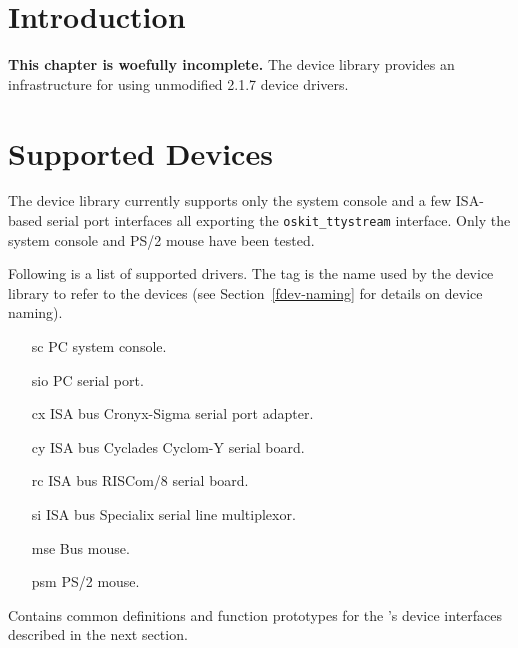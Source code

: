 %
% 
%

\label{freebsd-dev}

\section{Introduction}

{\bf This chapter is woefully incomplete. }
The \oskit{} \freebsd{} device library provides an infrastructure for using
unmodified \freebsd{} 2.1.7 device drivers.

\section{Supported Devices}
\label{freebsd-dev-sup}

The \freebsd{} device library currently supports only the system console and
a few ISA-based serial port interfaces all exporting the {\tt oskit_ttystream}
interface.
Only the system console and PS/2 mouse have been tested.

Following is a list of supported drivers.
The tag is the name used by the device library to refer to the devices
(see Section~\ref{fdev-naming} for details on device naming).
\begin{itemize}
\item[sc]
	PC system console.
\item[sio]
	PC serial port.
\item[cx]
	ISA bus Cronyx-Sigma serial port adapter.
\item[cy]
	ISA bus Cyclades Cyclom-Y serial board.
\item[rc]
	ISA bus RISCom/8 serial board.
\item[si]
	ISA bus Specialix serial line multiplexor.
\item[mse]
	Bus mouse.
\item[psm]
	PS/2 mouse.
\end{itemize}


\begin{apisyn}
\end{apisyn}
\begin{apidesc}
	Contains common definitions and function prototypes for
	the \oskit's \freebsd{} device interfaces described in the next section.
\end{apidesc}

